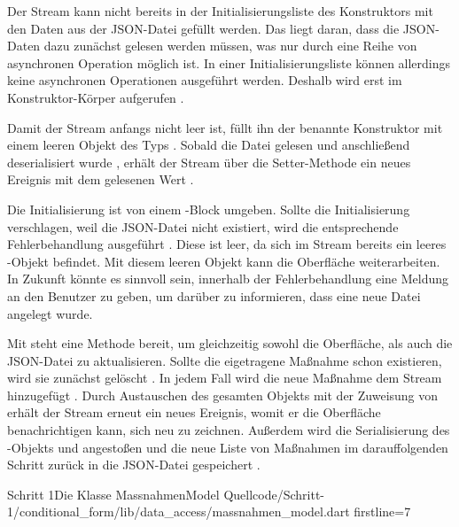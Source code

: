 Der Stream kann nicht bereits in der Initialisierungsliste des Konstruktors mit den Daten aus der JSON-Datei gefüllt werden.
Das liegt daran, dass die JSON-Daten dazu zunächst gelesen werden müssen, was nur durch eine Reihe von asynchronen Operation möglich ist.
In einer Initialisierungsliste können allerdings keine asynchronen Operationen ausgeführt werden.
Deshalb wird  erst im Konstruktor-Körper aufgerufen .

Damit der Stream anfangs nicht leer ist, füllt ihn der benannte Konstruktor  mit einem leeren Objekt des Typs  .
Sobald die Datei gelesen  und anschließend deserialisiert wurde , erhält der Stream über die Setter-Methode  ein neues Ereignis mit dem gelesenen Wert .

Die Initialisierung ist von einem -Block umgeben.
Sollte die Initialisierung verschlagen, weil die JSON-Datei nicht existiert, wird die entsprechende Fehlerbehandlung ausgeführt .
Diese ist leer, da sich im Stream bereits ein leeres -Objekt  befindet.
Mit diesem leeren Objekt kann die Oberfläche weiterarbeiten.
In Zukunft könnte es sinnvoll sein, innerhalb der Fehlerbehandlung eine Meldung an den Benutzer zu geben, um darüber zu informieren, dass eine neue Datei angelegt wurde.

Mit   steht eine Methode bereit, um gleichzeitig  sowohl die Oberfläche,  als auch die JSON-Datei zu aktualisieren.
Sollte die eigetragene Maßnahme schon existieren, wird sie zunächst gelöscht .
In jedem Fall wird die neue Maßnahme dem Stream hinzugefügt .
Durch Austauschen des gesamten Objekts mit der Zuweisung von   erhält der Stream erneut ein neues Ereignis, womit er die Oberfläche benachrichtigen kann, sich neu zu zeichnen. Außerdem wird die Serialisierung des -Objekts und angestoßen  und die neue Liste von Maßnahmen im darauffolgenden Schritt zurück in die JSON-Datei gespeichert .

\begin{alexlisting}{Schritt 1}{Die Klasse MassnahmenModel}
  {Quellcode/Schritt-1/conditional_form/lib/data_access/massnahmen_model.dart}
  {firstline=7}
  \label{lst:Schritt1KlasseMassnahmenModel}
\end{alexlisting}

\ifincludeall \clearpage \fi
